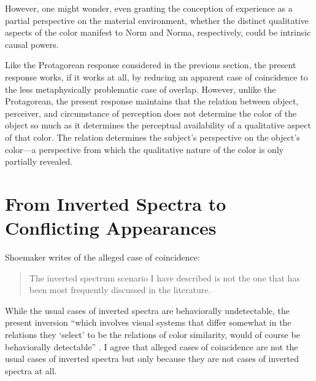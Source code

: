 \documentclass[12pt]{article}
\begin{document}

However, one might wonder, even granting the conception of experience as a partial perspective on the material environment, whether the distinct qualitative aspects of the color manifest to Norm and Norma, respectively, could be intrinsic causal powers.

Like the Protagorean response considered in the previous section, the present response works, if it works at all, by reducing an apparent case of coincidence to the less metaphysically problematic case of overlap. However, unlike the Protagorean, the present response maintains that the relation between object, perceiver, and circumstance of perception does not determine the color of the object so much as it determines the perceptual availability of a qualitative aspect of that color. The relation determines the subject's perspective on the object's color---a perspective from which the qualitative nature of the color is only partially revealed.

\section{From Inverted Spectra to Conflicting Appearances}\label{sec:conclusion}


Shoemaker writes of the alleged case of coincidence: 
\begin{quote}
	The inverted spectrum scenario I have described is not the one that has been most frequently discussed in the literature. \citep[270]{Shoemaker:wk} 
\end{quote}
While the usual cases of inverted spectra are behaviorally undetectable, the present inversion ``which involves visual systems that differ somewhat in the relations they `select' to be the relations of color similarity, would of course be behaviorally detectable'' \citep[270]{Shoemaker:wk}. I agree that alleged cases of coincidence are not the usual cases of inverted spectra but only because they are not cases of inverted spectra at all.
\end{document}
